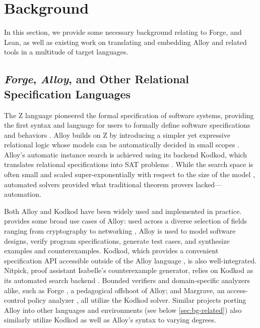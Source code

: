 \section{Background}\label{sec:background}

In this section, we provide some necessary background relating to Forge, and Lean, as well as existing work on translating and embedding Alloy and related tools in a multitude of target languages. 

\subsection{\emph{Forge}, \emph{Alloy}, and Other Relational Specification Languages}\label{sec:bg-forge}

The Z language pioneered the formal specification of software systems, providing the first syntax and language for users to formally define software specifications and behaviors \cite{spivey1992z}. Alloy builds on Z by introducing a simpler yet expressive relational logic whose models can be automatically decided in small scopes \cite{jackson2019alloy}. Alloy's automatic instance search is achieved using its backend Kodkod, which translates relational specifications into SAT problems \cite{torlak2007kodkod}. While the search space is often small and scaled super-exponentially with respect to the size of the model \cite{jackson2019alloy}, automated solvers provided what traditional theorem provers lacked---automation. 

Both Alloy and Kodkod have been widely used and implemented in practice. \cite{torlak2013applications} provides some broad use cases of Alloy: used across a diverse selection of fields ranging from cryptography to networking \cite{torlak2013applications}, Alloy is used to model software designs, verify program specifications, generate test cases, and synthesize examples and counterexamples. Kodkod, which provides a convenient specification API accessible outside of the Alloy language \cite{torlak2007kodkod}, is also well-integrated. Nitpick, proof assistant Isabelle's counterexample generator, relies on Kodkod as its automated search backend \cite{blanchette2010nitpick}. Bounded verifiers and domain-specific analyzers alike, such as Forge \cite{ngpdbccdlrrvwwk-oopsla-2024}, a pedagogical offshoot of Alloy; and Margrave, an access-control policy analyzer \cite{nelson2010margrave}, all utilize the Kodkod solver. Similar projects porting Alloy into other languages and environments (see below \cref{sec:bg-related}) also similarly utilize Kodkod as well as Alloy's syntax to varying degrees. 

